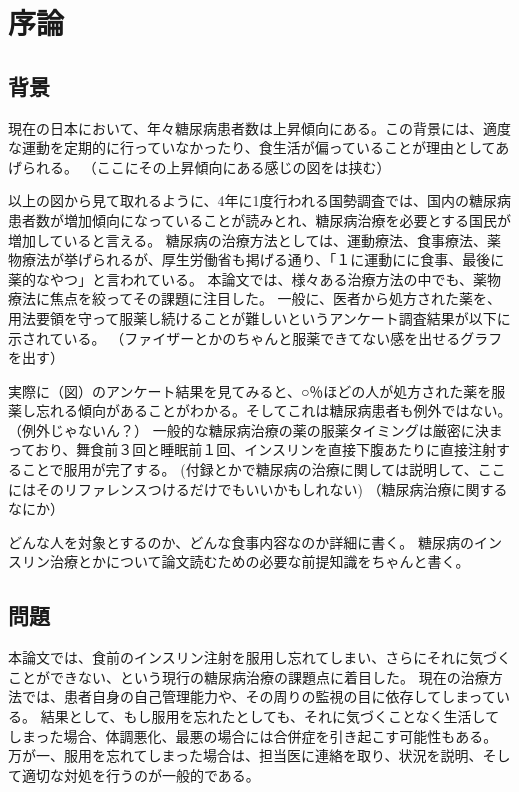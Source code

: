 \chapter{序論}
\label{chap:introduction}

\section{背景}
\label{section:background}
現在の日本において、年々糖尿病患者数は上昇傾向にある。この背景には、適度な運動を定期的に行っていなかったり、食生活が偏っていることが理由としてあげられる。
（ここにその上昇傾向にある感じの図をは挟む）

以上の図から見て取れるように、4年に1度行われる国勢調査では、国内の糖尿病患者数が増加傾向になっていることが読みとれ、糖尿病治療を必要とする国民が増加していると言える。
糖尿病の治療方法としては、運動療法、食事療法、薬物療法が挙げられるが、厚生労働省も掲げる通り、「１に運動にに食事、最後に薬的なやつ」と言われている。
本論文では、様々ある治療方法の中でも、薬物療法に焦点を絞ってその課題に注目した。
一般に、医者から処方された薬を、用法要領を守って服薬し続けることが難しいというアンケート調査結果が以下に示されている。
（ファイザーとかのちゃんと服薬できてない感を出せるグラフを出す）

実際に（図）のアンケート結果を見てみると、○％ほどの人が処方された薬を服薬し忘れる傾向があることがわかる。そしてこれは糖尿病患者も例外ではない。（例外じゃないん？）
一般的な糖尿病治療の薬の服薬タイミングは厳密に決まっており、舞食前３回と睡眠前１回、インスリンを直接下腹あたりに直接注射することで服用が完了する。
(付録とかで糖尿病の治療に関しては説明して、ここにはそのリファレンスつけるだけでもいいかもしれない)
（糖尿病治療に関するなにか）

どんな人を対象とするのか、どんな食事内容なのか詳細に書く。
糖尿病のインスリン治療とかについて論文読むための必要な前提知識をちゃんと書く。

\section{問題}
\label{section:problem}

本論文では、食前のインスリン注射を服用し忘れてしまい、さらにそれに気づくことができない、という現行の糖尿病治療の課題点に着目した。
現在の治療方法では、患者自身の自己管理能力や、その周りの監視の目に依存してしまっている。
結果として、もし服用を忘れたとしても、それに気づくことなく生活してしまった場合、体調悪化、最悪の場合には合併症を引き起こす可能性もある。
万が一、服用を忘れてしまった場合は、担当医に連絡を取り、状況を説明、そして適切な対処を行うのが一般的である。

